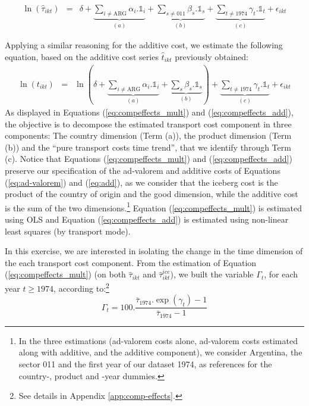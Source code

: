 \documentclass[a4paper,11pt]{article}
\begin{document}
\begin{eqnarray}
\ln(\widehat{\tau}_{ikt})&=&\delta +\underbrace{\sum_{i \neq \text{ARG}}\alpha_i.\mathbb{1}_i}_{(a)} + \underbrace{\sum_{s\neq \text{011}}\beta_s.\mathbb{1}_s}_{(b)} + \underbrace{\sum_{t \neq 1974}\gamma_t.\mathbb{1}_t}_{(c)}+\epsilon_{ikt} \label{eq:compeffects_mult}
\end{eqnarray}

Applying a similar reasoning for the additive cost, we estimate the following equation, based on the additive cost series $\widehat{t}_{ikt}$ previously obtained:
\begin{eqnarray}
\ln(t_{ikt})&=&\ln\left( \delta + \underbrace{\sum_{i \neq \text{ARG}}  \alpha_i.\mathbb{1}_i}_{(a)}+\underbrace{\sum_{s}\beta_s.\mathbb{1}_s}_{(b)}\right) + \underbrace{\sum_{t \neq 1974}\gamma_t.\mathbb{1}_t}_{(c)}+\epsilon_{ikt} \label{eq:compeffects_add}
\end{eqnarray}
As displayed in Equations (\ref{eq:compeffects_mult}) and (\ref{eq:compeffects_add}), the objective is to decompose the estimated transport cost component in three components: The country dimension (Term (a)), the product dimension (Term (b)) and the ``pure transport costs time trend'', that we identify through Term (c). Notice that Equations (\ref{eq:compeffects_mult}) and (\ref{eq:compeffects_add}) preserve our specification of the ad-valorem and additive costs of Equations (\ref{eq:ad-valorem}) and (\ref{eq:add}), as we consider that the iceberg cost is the product of the country of origin and the good dimension, while the additive cost is the sum of the two dimensions.\footnote{In the three estimations (ad-valorem costs alone, ad-valorem costs estimated along with additive, and the additive component), we consider Argentina, the sector 011 and the first year of our dataset 1974, as references for the country-, product and -year dummies.}
Equation (\ref{eq:compeffects_mult}) is estimated using OLS and Equation (\ref{eq:compeffects_add}) is estimated using non-linear least squares (by transport mode).

In this exercise, we are interested in isolating the change in the time dimension of the each transport cost component. From the estimation of Equation (\ref{eq:compeffects_mult}) (on both $\widehat{\tau}_{ikt}$ and $\widehat{\tau}_{ikt}^{ice}$), we built the variable $\Gamma_t$, for each year $t\geq 1974$, according to:\footnote{See details in Appendix \ref{app:comp-effects}.}
\begin{equation*}
\Gamma_t = 100.\frac {\bar{\tau}_{1974}.\exp(\gamma_t)-1} {\bar{\tau}_{1974}-1}
\end{equation*}
\end{document}
